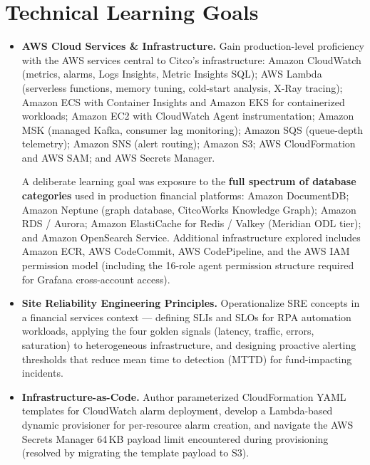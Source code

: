 \section{Technical Learning Goals}

\begin{itemize}
    \item \textbf{AWS Cloud Services \& Infrastructure.}
          Gain production-level proficiency with the AWS services central to
          Citco's infrastructure: Amazon CloudWatch (metrics, alarms, Logs
          Insights, Metric Insights SQL); AWS Lambda (serverless functions,
          memory tuning, cold-start analysis, X-Ray tracing); Amazon ECS
          with Container Insights and Amazon EKS for containerized
          workloads; Amazon EC2 with CloudWatch Agent instrumentation;
          Amazon MSK (managed Kafka, consumer lag monitoring); Amazon SQS
          (queue-depth telemetry); Amazon SNS (alert routing); Amazon S3;
          AWS CloudFormation and AWS SAM; and AWS Secrets Manager.

          A deliberate learning goal was exposure to the \textbf{full
          spectrum of database categories} used in production financial
          platforms: Amazon DocumentDB; Amazon Neptune (graph database,
          CitcoWorks Knowledge Graph); Amazon RDS / Aurora; Amazon
          ElastiCache for Redis / Valkey (Meridian ODL tier); and Amazon
          OpenSearch Service. Additional infrastructure explored includes
          Amazon ECR, AWS CodeCommit, AWS CodePipeline, and the AWS IAM
          permission model (including the 16-role agent permission structure
          required for Grafana cross-account access).

    \item \textbf{Site Reliability Engineering Principles.}
          Operationalize SRE concepts in a financial services context ---
          defining SLIs and SLOs for RPA automation workloads, applying the
          four golden signals (latency, traffic, errors, saturation) to
          heterogeneous infrastructure, and designing proactive alerting
          thresholds that reduce mean time to detection (MTTD) for
          fund-impacting incidents.

    \item \textbf{Infrastructure-as-Code.}
          Author parameterized CloudFormation YAML templates for CloudWatch
          alarm deployment, develop a Lambda-based dynamic provisioner for
          per-resource alarm creation, and navigate the AWS Secrets Manager
          64\,KB payload limit encountered during provisioning (resolved by
          migrating the template payload to S3).


\end{itemize}
